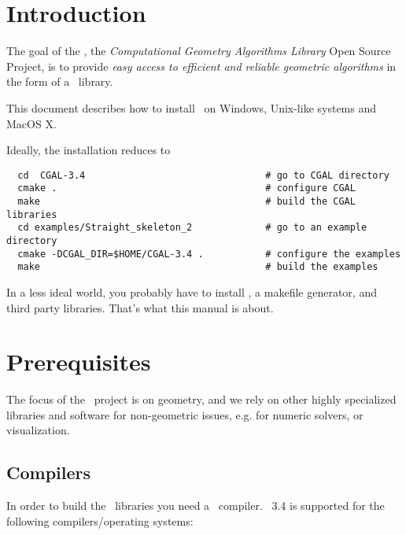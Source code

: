 \newcommand{\TTindex}[1]{\index{#1@{\tt #1}}}
\newcommand{\TTsubindex}[2]{\index{#1@{\tt #1}!{#2}}}
\newcommand{\TTsubindextwo}[2]{\index{#1!#2@{\tt #2} }}

\section{Introduction}


The goal of the \cgal, the \textit{Computational Geometry Algorithms Library}
 Open Source Project, is to provide {\em easy access to efficient and reliable 
geometric algorithms} in the form of a \CC\ library.

This document describes how to install \cgal\ on Windows, Unix-like systems and MacOS X.

Ideally, the installation reduces to

\begin{verbatim}
  cd  CGAL-3.4                                # go to CGAL directory
  cmake .                                     # configure CGAL
  make                                        # build the CGAL libraries
  cd examples/Straight_skeleton_2             # go to an example directory
  cmake -DCGAL_DIR=$HOME/CGAL-3.4 .           # configure the examples
  make                                        # build the examples 
\end{verbatim}

In a less ideal world, you probably have to install \cmake, a makefile
generator, and third party libraries. That's what this manual is about.

\section{Prerequisites\label{sec:prerequisites}}

The focus of the \cgal\ project is on geometry, and we rely on other
highly specialized libraries and software for non-geometric issues,
e.g. for numeric solvers, or visualization.

\subsection{Compilers}

In order to build the \cgal\ libraries you need a \CC\ compiler.  
\cgal~3.4 is supported for the following compilers/operating systems:


